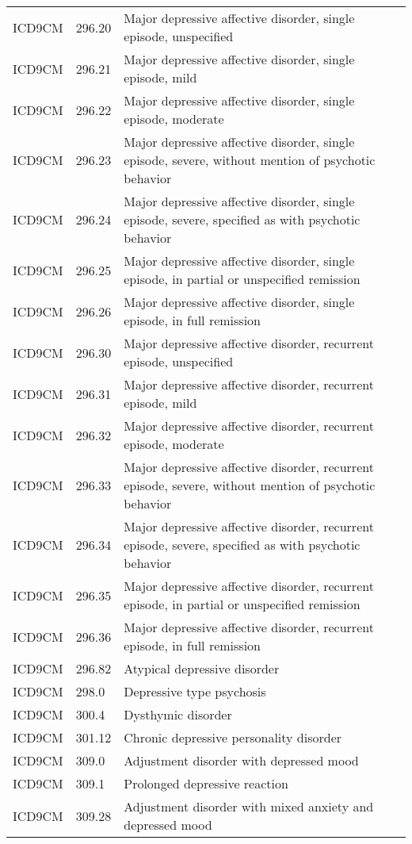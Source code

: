 \begin{longtable}{p{}p{}p{}}
  ICD9CM & 296.20 & Major depressive affective disorder, single episode, unspecified \\ 
  ICD9CM & 296.21 & Major depressive affective disorder, single episode, mild \\ 
  ICD9CM & 296.22 & Major depressive affective disorder, single episode, moderate \\ 
  ICD9CM & 296.23 & Major depressive affective disorder, single episode, severe, without mention of psychotic behavior \\ 
  ICD9CM & 296.24 & Major depressive affective disorder, single episode, severe, specified as with psychotic behavior \\ 
  ICD9CM & 296.25 & Major depressive affective disorder, single episode, in partial or unspecified remission \\ 
  ICD9CM & 296.26 & Major depressive affective disorder, single episode, in full remission \\ 
  ICD9CM & 296.30 & Major depressive affective disorder, recurrent episode, unspecified \\ 
  ICD9CM & 296.31 & Major depressive affective disorder, recurrent episode, mild \\ 
  ICD9CM & 296.32 & Major depressive affective disorder, recurrent episode, moderate \\ 
  ICD9CM & 296.33 & Major depressive affective disorder, recurrent episode, severe, without mention of psychotic behavior \\ 
  ICD9CM & 296.34 & Major depressive affective disorder, recurrent episode, severe, specified as with psychotic behavior \\ 
  ICD9CM & 296.35 & Major depressive affective disorder, recurrent episode, in partial or unspecified remission \\ 
  ICD9CM & 296.36 & Major depressive affective disorder, recurrent episode, in full remission \\ 
  ICD9CM & 296.82 & Atypical depressive disorder \\ 
  ICD9CM & 298.0 & Depressive type psychosis \\ 
  ICD9CM & 300.4 & Dysthymic disorder \\ 
  ICD9CM & 301.12 & Chronic depressive personality disorder \\ 
  ICD9CM & 309.0 & Adjustment disorder with depressed mood \\ 
  ICD9CM & 309.1 & Prolonged depressive reaction \\ 
  ICD9CM & 309.28 & Adjustment disorder with mixed anxiety and depressed mood \\ 

\end{longtable}
